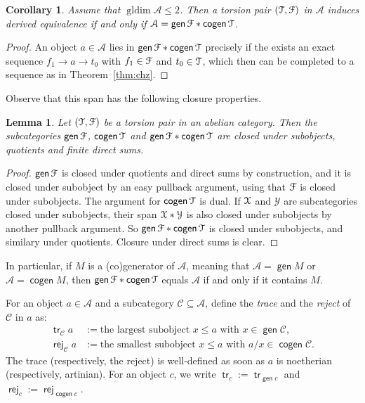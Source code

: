 \documentclass[a4paper,11pt]{amsart}
\theoremstyle{plain}
\newtheorem{cor}[thm]{Corollary}
\newtheorem{lemma}[thm]{Lemma}
\theoremstyle{definition}
\newcommand{\Acal}{\mathcal{A}} \newcommand{\Bcal}{\mathcal{B}} \newcommand{\Ccal}{\mathcal{C}}
\newcommand{\Ycal}{\mathcal{Y}} \newcommand{\Zcal}{\mathcal{Z}}
\DeclareMathOperator{\gldim}{gldim}
\DeclareMathOperator{\gen}{\mathsf{gen}}
\DeclareMathOperator{\cogen}{\mathsf{cogen}}
\DeclareMathOperator{\tr}{\mathsf{tr}}
\DeclareMathOperator{\rej}{\mathsf{rej}}
\begin{document}
\begin{cor}
	Assume that $\gldim\Acal\leq 2$. Then a torsion pair $(\mathcal{T},\mathcal{F})$ in
	$\Acal$ induces derived equivalence if and only if $\Acal=\gen\Fcal\ast\cogen\Tcal$.
\end{cor}

\begin{proof}
	An object $a\in\Acal$ lies in $\gen\Fcal\ast\cogen\Tcal$ precisely if the exists
	an exact sequence $f_1\to a\to t_0$ with $f_1\in\mathcal{F}$ and $t_0\in\mathcal{T}$,
	which then can be completed to a sequence as in Theorem~\ref{thm:chz}.
\end{proof}

Observe that this span has the following closure properties.

\begin{lemma}
	Let $(\mathcal{T},\mathcal{F})$ be a torsion pair in an abelian category. Then
	the subcategories $\gen\Fcal$, $\cogen\Tcal$ and $\gen\Fcal\ast\cogen\Tcal$
	are closed under subobjects, quotients and finite direct sums.
\end{lemma}

\begin{proof}
	$\gen\Fcal$ is closed under quotients and direct sums by construction, and it
	is closed under subobject by an easy pullback argument, using that $\mathcal{F}$ is
	closed under subobjects. The argument for $\cogen\Tcal$ is dual. If
	$\mathcal{X}$ and $\Ycal$ are subcategories closed under subobjects,
	their span $\Xcal\ast\Ycal$ is also closed under subobjects by another
	pullback argument. So $\gen\Fcal\ast\cogen\Tcal$ is closed under subobjects,
	and similary under quotients. Closure under direct sums is clear.
\end{proof}

In particular, if $M$ is a (co)generator of $\Acal$, meaning that $\Acal=\gen M$
or $\Acal=\cogen M$, then $\gen\Fcal\ast\cogen\Tcal$ equals $\Acal$ if and only
if it contains $M$.

For an object $a\in\Acal$ and a subcategory $\Ccal\subseteq\Acal$, define the
\emph{trace} and the \emph{reject} of $\Ccal$ in $a$ as:
\begin{align*}
	\tr_\Ccal a&:= \text{the largest subobject } x\leq a \text{ with } x\in\gen\Ccal,\\
	\rej_\Ccal a&:= \text{the smallest subobject } x\leq a \text{ with } a/x\in\cogen\Ccal.
\end{align*}
The trace (respectively, the reject) is well-defined as soon as $a$ is
noetherian (respectively, artinian).
For an object $c$, we write
$\tr_c:=\tr_{\gen c}$ and $\rej_c:=\rej_{\cogen c}$.
\end{document}
